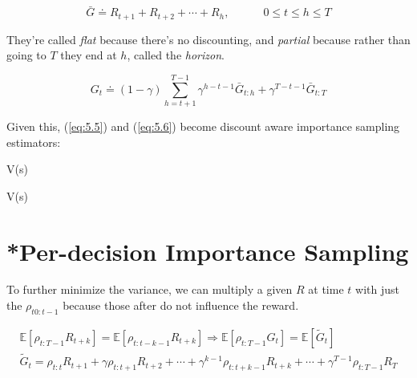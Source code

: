 \begin{equation*}
    \bar{G} \doteq R_{t+1} + R_{t+2} + \cdots + R_h,
    \hspace{3em}
    0 \leq t \le h \leq T
\end{equation*}

They're called \emph{flat} because there's no discounting, and \emph{partial} because rather
than going to $T$ they end at $h$, called the \emph{horizon}.

\begin{equation*}
    G_t \doteq (1-\gamma)\sum_{h=t+1}^{T-1}\gamma^{h-t-1}\bar{G}_{t:h}
        + \gamma^{T-t-1}\bar{G}_{t:T}
\end{equation*}

Given this, (\ref{eq:5.5}) and (\ref{eq:5.6}) become discount aware importance
sampling estimators:

\begin{myequation}{5.9}
    V(s)\doteq{}
\end{myequation}

\begin{myequation}{5.10}
    V(s)\doteq{}
\end{myequation}

\section{*Per-decision Importance Sampling}
\label{sec:per_decision_importance_sampling}
To further minimize the variance, we can multiply a given $R$ at time $t$ with just the
$\rho_{t0:t-1}$ because those after do not influence the reward.

\begin{equation*}
    \begin{gathered}
        \mathbb{E}\left[\rho_{t:T-1}R_{t+k}\right]=\mathbb{E}\left[\rho_{t:t-k-1}R_{t+k}\right]
        \Rightarrow
        \mathbb{E}\left[\rho_{t:T-1}G_t\right]=\mathbb{E}\left[\tilde{G}_t\right] \\
        \tilde{G}_t=\rho_{t:t}R_{t+1}+\gamma\rho_{t:t+1}R_{t+2}+\cdots
        +\gamma^{k-1}\rho_{t:t+k-1}R_{t+k}+\cdots+\gamma^{T-1}\rho_{t:T-1}R_T\\
    \end{gathered}
\end{equation*}

